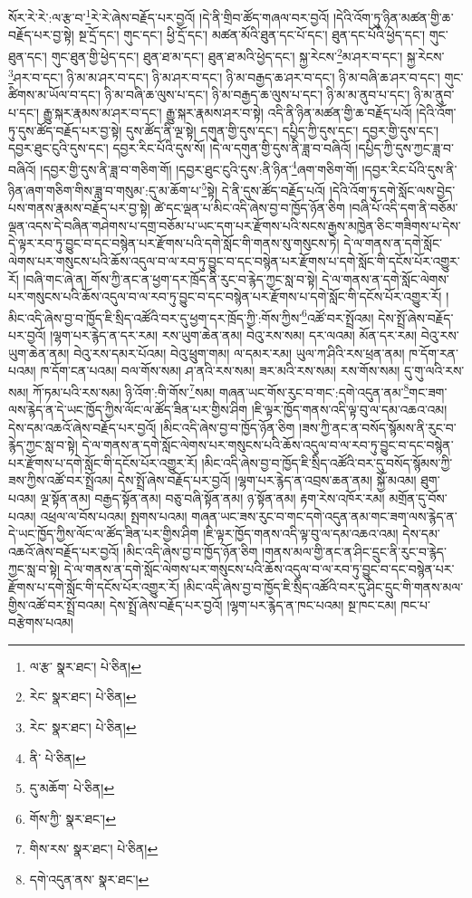 སོར་རེ་རེ་:ལ་རྩ་བ་\footnote{ལ་རྩ་  སྣར་ཐང་།  པེ་ཅིན། }རེ་རེ་ཞེས་བརྗོད་པར་བྱའོ། །དེ་ནི་གྲིབ་ཚོད་གཞལ་བར་བྱའོ། །དེའི་འོག་ཏུ་ཉིན་མཚན་གྱི་ཆ་བརྗོད་པར་བྱ་སྟེ། སྔ་དྲོ་དང་། གུང་དང་། ཕྱི་དྲོ་དང་། མཚན་མོའི་ཐུན་དང་པོ་དང་། ཐུན་དང་པོའི་ཕྱེད་དང་། གུང་ཐུན་དང་། གུང་ཐུན་གྱི་ཕྱེད་དང་། ཐུན་ཐ་མ་དང་། ཐུན་ཐ་མའི་ཕྱེད་དང་། སྐྱ་རེངས་\footnote{རེང་  སྣར་ཐང་།  པེ་ཅིན། }མ་ཤར་བ་དང་། སྐྱ་རེངས་\footnote{རེང་  སྣར་ཐང་།  པེ་ཅིན། }ཤར་བ་དང་། ཉི་མ་མ་ཤར་བ་དང་། ཉི་མ་ཤར་བ་དང་། ཉི་མ་བརྒྱད་ཆ་ཤར་བ་དང་། ཉི་མ་བཞི་ཆ་ཤར་བ་དང་། གུང་ཚིགས་མ་ཡོལ་བ་དང་། ཉི་མ་བཞི་ཆ་ལུས་པ་དང་། ཉི་མ་བརྒྱད་ཆ་ལུས་པ་དང་། ཉི་མ་མ་ནུབ་པ་དང་། ཉི་མ་ནུབ་པ་དང་། རྒྱུ་སྐར་རྣམས་མ་ཤར་བ་དང་། རྒྱུ་སྐར་རྣམས་ཤར་བ་སྟེ། འདི་ནི་ཉིན་མཚན་གྱི་ཆ་བརྗོད་པའོ། །དེའི་འོག་ཏུ་དུས་ཚོད་བརྗོད་པར་བྱ་སྟེ། དུས་ཚོད་ནི་ལྔ་སྟེ། དགུན་གྱི་དུས་དང་། དཔྱིད་ཀྱི་དུས་དང་། དབྱར་གྱི་དུས་དང་། དབྱར་ཐུང་ངུའི་དུས་དང་། དབྱར་རིང་པོའི་དུས་སོ། །དེ་ལ་དགུན་གྱི་དུས་ནི་ཟླ་བ་བཞིའོ། །དཔྱིད་ཀྱི་དུས་ཀྱང་ཟླ་བ་བཞིའོ། །དབྱར་གྱི་དུས་ནི་ཟླ་བ་གཅིག་གོ། །དབྱར་ཐུང་ངུའི་དུས་:ནི་ཉིན་\footnote{ནི་  པེ་ཅིན། }ཞག་གཅིག་གོ། །དབྱར་རིང་པོའི་དུས་ནི་ཉིན་ཞག་གཅིག་གིས་ཟླ་བ་གསུམ་:དུ་མ་ཆོག་པ་\footnote{དུ་མཆོག་  པེ་ཅིན། }སྟེ། དེ་ནི་དུས་ཚོད་བརྗོད་པའོ། །དེའི་འོག་ཏུ་དགེ་སློང་ལས་བྱེད་པས་གནས་རྣམས་བརྗོད་པར་བྱ་སྟེ། ཚེ་དང་ལྡན་པ་མིང་འདི་ཞེས་བྱ་བ་ཁྱོད་ཉོན་ཅིག །བཞི་པོ་འདི་དག་ནི་བཅོམ་ལྡན་འདས་དེ་བཞིན་གཤེགས་པ་དགྲ་བཅོམ་པ་ཡང་དག་པར་རྫོགས་པའི་སངས་རྒྱས་མཁྱེན་ཅིང་གཟིགས་པ་དེས་དེ་ལྟར་རབ་ཏུ་བྱུང་བ་དང་བསྙེན་པར་རྫོགས་པའི་དགེ་སློང་གི་གནས་སུ་གསུངས་ཏེ། དེ་ལ་གནས་ན་དགེ་སློང་ལེགས་པར་གསུངས་པའི་ཆོས་འདུལ་བ་ལ་རབ་ཏུ་བྱུང་བ་དང་བསྙེན་པར་རྫོགས་པ་དགེ་སློང་གི་དངོས་པོར་འགྱུར་རོ། །བཞི་གང་ཞེ་ན། གོས་ཀྱི་ནང་ན་ཕྱག་དར་ཁྲོད་ནི་རུང་བ་རྙེད་ཀྱང་སླ་བ་སྟེ། དེ་ལ་གནས་ན་དགེ་སློང་ལེགས་པར་གསུངས་པའི་ཆོས་འདུལ་བ་ལ་རབ་ཏུ་བྱུང་བ་དང་བསྙེན་པར་རྫོགས་པ་དགེ་སློང་གི་དངོས་པོར་འགྱུར་རོ། །མིང་འདི་ཞེས་བྱ་བ་ཁྱོད་ཇི་སྲིད་འཚོའི་བར་དུ་ཕྱག་དར་ཁྲོད་ཀྱི་:གོས་ཀྱིས་\footnote{གོས་ཀྱི་  སྣར་ཐང་། }འཚོ་བར་སྤྲོའམ། དེས་སྤྲོ་ཞེས་བརྗོད་པར་བྱའོ། །ལྷག་པར་རྙེད་ན་དར་རམ། རས་ཡུག་ཆེན་ནམ། བེའུ་རས་སམ། དར་ལའམ། མོན་དར་རམ། བེའུ་རས་ཡུག་ཆེན་ནམ། བེའུ་རས་དམར་པོའམ། བེའུ་ཕྲུག་གམ། ལ་དམར་རམ། ཡུལ་ཀ་ཤིའི་རས་ཕྲན་ནམ། ཁ་དོག་རན་པའམ། ཁ་དོག་ངན་པའམ། བལ་གོས་སམ། ཤ་ནའི་རས་སམ། ཟར་མའི་རས་སམ། རས་གོས་སམ། དུ་གུ་ལའི་རས་སམ། ཀོ་ཏམ་པའི་རས་སམ། ཉི་འོག་:གི་གོས་\footnote{གིས་རས་  སྣར་ཐང་།  པེ་ཅིན། }སམ། གཞན་ཡང་གོས་རུང་བ་གང་:དགེ་འདུན་ནམ་\footnote{དགེ་འདུན་ནས་  སྣར་ཐང་། }གང་ཟག་ལས་རྙེད་ན་དེ་ཡང་ཁྱོད་ཀྱིས་ལོང་ལ་ཚོད་ཟིན་པར་གྱིས་ཤིག །ཇི་ལྟར་ཁྱོད་གནས་འདི་ལྟ་བུ་ལ་དམ་འཆའ་འམ། དེས་དམ་འཆའོ་ཞེས་བརྗོད་པར་བྱའོ། །མིང་འདི་ཞེས་བྱ་བ་ཁྱོད་ཉོན་ཅིག །ཟས་ཀྱི་ནང་ན་བསོད་སྙོམས་ནི་རུང་བ་རྙེད་ཀྱང་སླ་བ་སྟེ། དེ་ལ་གནས་ན་དགེ་སློང་ལེགས་པར་གསུངས་པའི་ཆོས་འདུལ་བ་ལ་རབ་ཏུ་བྱུང་བ་དང་བསྙེན་པར་རྫོགས་པ་དགེ་སློང་གི་དངོས་པོར་འགྱུར་རོ། །མིང་འདི་ཞེས་བྱ་བ་ཁྱོད་ཇི་སྲིད་འཚོའི་བར་དུ་བསོད་སྙོམས་ཀྱི་ཟས་ཀྱིས་འཚོ་བར་སྤྲོའམ། དེས་སྤྲོ་ཞེས་བརྗོད་པར་བྱའོ། །ལྷག་པར་རྙེད་ན་འབྲས་ཆན་ནམ། སྐྱོ་མའམ། ཐུག་པའམ། ལྔ་སྟོན་ནམ། བརྒྱད་སྟོན་ནམ། བཅུ་བཞི་སྟོན་ནམ། ཉ་སྟོན་ནམ། རྟག་རེས་འཁོར་རམ། མགྲོན་དུ་བོས་པའམ། འཕྲལ་ལ་བོས་པའམ། སྤགས་པའམ། གཞན་ཡང་ཟས་རུང་བ་གང་དགེ་འདུན་ནམ་གང་ཟག་ལས་རྙེད་ན་དེ་ཡང་ཁྱོད་ཀྱིས་ལོང་ལ་ཚོད་ཟིན་པར་གྱིས་ཤིག །ཇི་ལྟར་ཁྱོད་གནས་འདི་ལྟ་བུ་ལ་དམ་འཆའ་འམ། དེས་དམ་འཆའོ་ཞེས་བརྗོད་པར་བྱའོ། །མིང་འདི་ཞེས་བྱ་བ་ཁྱོད་ཉོན་ཅིག །གནས་མལ་གྱི་ནང་ན་ཤིང་དྲུང་ནི་རུང་བ་རྙེད་ཀྱང་སླ་བ་སྟེ། དེ་ལ་གནས་ན་དགེ་སློང་ལེགས་པར་གསུངས་པའི་ཆོས་འདུལ་བ་ལ་རབ་ཏུ་བྱུང་བ་དང་བསྙེན་པར་རྫོགས་པ་དགེ་སློང་གི་དངོས་པོར་འགྱུར་རོ། །མིང་འདི་ཞེས་བྱ་བ་ཁྱོད་ཇི་སྲིད་འཚོའི་བར་དུ་ཤིང་དྲུང་གི་གནས་མལ་གྱིས་འཚོ་བར་སྤྲོ་བའམ། དེས་སྤྲོ་ཞེས་བརྗོད་པར་བྱའོ། །ལྷག་པར་རྙེད་ན་ཁང་པའམ། སྔ་ཁང་ངམ། ཁང་པ་བརྩེགས་པའམ། 